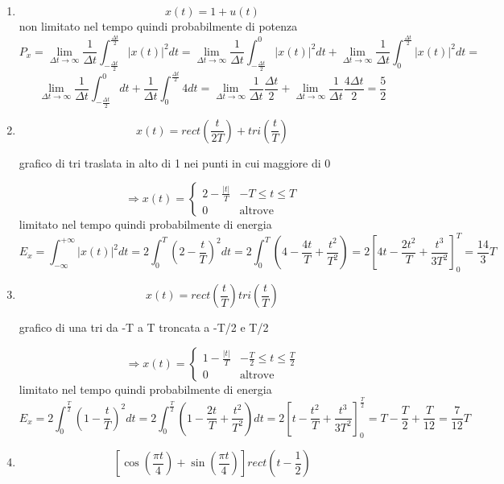 \documentclass{article}
\begin{document}
\begin{enumerate}
    \item \LARGE\[x(t)=1+u(t)\]\normalsize
    non limitato nel tempo quindi probabilmente di potenza
        \[P_x=\lim_{\Delta t\to\infty}\frac{1}{\Delta t}\int_{-\frac{\Delta t}{2}}^{\frac{\Delta t}{2}}|x(t)|^2 dt=\lim_{\Delta t\to\infty}\frac{1}{\Delta t}\int_{-\frac{\Delta t}{2}}^{0}|x(t)|^2 dt+\lim_{\Delta t\to\infty}\frac{1}{\Delta t}\int_{0}^{\frac{\Delta t}{2}}|x(t)|^2 dt=\]
        \[\lim_{\Delta t\to\infty}\frac{1}{\Delta t}\int_{-\frac{\Delta t}{2}}^{0} dt+\frac{1}{\Delta t}\int_{0}^{\frac{\Delta t}{2}}4 dt=\lim_{\Delta t\to\infty}\frac{1}{\Delta t}\frac{\Delta t}{2}+\lim_{\Delta t\to\infty}\frac{1}{\Delta t}\frac{4\Delta t}{2}=\frac{5}{2}\]
    \item \LARGE\[x(t)=rect\left(\frac{t}{2T}\right)+tri\left(\frac{t}{T}\right)\]\normalsize
        \begin{center}grafico di tri traslata in alto di 1 nei punti in cui maggiore di 0\end{center}
        \[\Rightarrow x(t)=\begin{cases}2-\frac{|t|}{T}&-T\leq t\leq T\\0&\text{altrove}\end{cases}\]
        limitato nel tempo quindi probabilmente di energia
        \[E_x=\int_{-\infty}^{+\infty}|x(t)|^2dt=2\int_{0}^{T}{\left(2-\frac{t}{T}\right)}^2dt=2\int_{0}^{T}\left(4-\frac{4t}{T}+\frac{t^2}{T^2}\right)=2{\left[4t-\frac{2t^2}{T}+\frac{t^3}{3T^2}\right]}_0^T=\frac{14}{3}T\]
    \item \LARGE\[x(t)=rect\left(\frac{t}{T}\right)tri\left(\frac{t}{T}\right)\]\normalsize
        \begin{center}grafico di una tri da -T a T troncata a -T/2 e T/2\end{center}
        \[\Rightarrow x(t)=\begin{cases}1-\frac{|t|}{T}&-\frac{T}{2}\leq t\leq\frac{T}{2}\\0&\text{altrove}\end{cases}\]
        limitato nel tempo quindi probabilmente di energia
        \[E_x=2\int_{0}^{\frac{T}{2}}{\left(1-\frac{t}{T}\right)}^2dt=2\int_{0}^{\frac{T}{2}}\left(1-\frac{2t}{T}+\frac{t^2}{T^2}\right)dt=2{\left[t-\frac{t^2}{T}+\frac{t^3}{3T^2}\right]}_0^{\frac{T}{2}}=T-\frac{T}{2}+\frac{T}{12}=\frac{7}{12}T\]
    \item \LARGE\[\left[\cos\left(\frac{\pi t}{4}\right)+\sin\left(\frac{\pi t}{4}\right)\right]rect\left(t-\frac{1}{2}\right)\]\normalsize

\end{enumerate}
\end{document}
